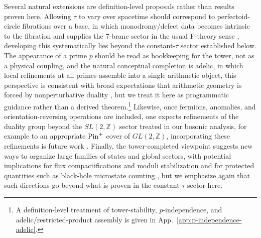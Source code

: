 \documentclass[11pt]{article}
\theoremstyle{remark}
\newcommand{\Z}{\mathbb{Z}}
\begin{document}
Several natural extensions are definition-level proposals rather than results proven here. Allowing \(\tau\) to vary over spacetime should correspond to perfectoid-circle fibrations over a base, in which monodromy/defect data becomes intrinsic to the fibration and supplies the 7-brane sector in the usual F-theory sense \cite{Sen1996, DasguptaMukhi1997, GaberdielZwiebach1998}, developing this systematically lies beyond the constant-\(\tau\) sector established below. The appearance of a prime \(p\) should be read as bookkeeping for the tower, not as a physical coupling, and the natural conceptual completion is adelic, in which local refinements at all primes assemble into a single arithmetic object, this perspective is consistent with broad expectations that arithmetic geometry is forced by nonperturbative duality \cite{Frenkel2007, GaitsgoryLurie2019}, but we treat it here as programmatic guidance rather than a derived theorem.\footnote{A definition-level treatment of tower-stability, $p$-independence, and adelic/restricted-product assembly is given in App.~\ref{app:p-independence-adelic}.
} Likewise, once fermions, anomalies, and orientation-reversing operations are included, one expects refinements of the duality group beyond the \(SL(2,\Z)\) sector treated in our bosonic analysis, for example to an appropriate \({\rm Pin}^{+}\) cover of \(GL(2,\Z)\), incorporating these refinements is future work \cite{DebrayDieriglHeckmanMontero2021}. Finally, the tower-completed viewpoint suggests new ways to organize large families of states and global sectors, with potential implications for flux compactifications and moduli stabilization \cite{Denef2008, Douglas2007} and for protected quantities such as black-hole microstate counting \cite{MaldacenaStrominger1997}, but we emphasize again that such directions go beyond what is proven in the constant-\(\tau\) sector here.
\end{document}
